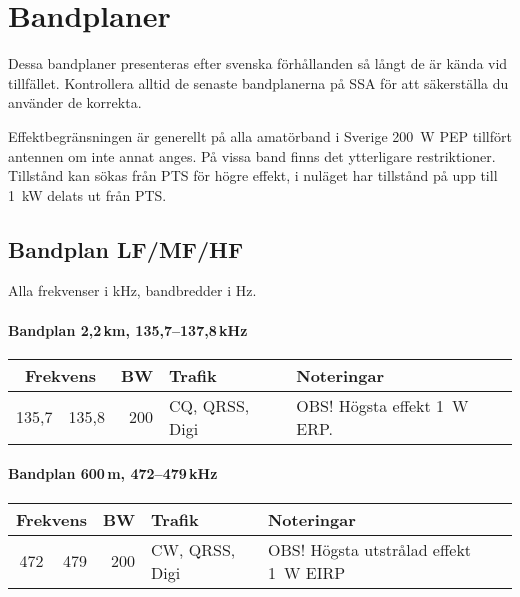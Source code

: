 \onecolumn

\chapter{Bandplaner}
\label{bandplaner2}

\noindent Dessa bandplaner presenteras efter svenska förhållanden så långt de
är kända vid tillfället. Kontrollera alltid de senaste bandplanerna på SSA för
att säkerställa du använder de korrekta.

Effektbegränsningen är generellt på alla amatörband i Sverige \SI{200}{W} PEP
tillfört antennen om inte annat anges. På vissa band finns det ytterligare
restriktioner. Tillstånd kan sökas från PTS för högre effekt, i nuläget har
tillstånd på upp till \SI{1}{kW} delats ut från PTS.

\section{Bandplan LF/MF/HF}

Alla frekvenser i \si{\kilo\hertz}, bandbredder i \si{\hertz}.

\subsubsection{Bandplan 2,2\,km, 135,7--137,8\,kHz}
\begin{tabular}{rrrll}
\multicolumn{2}{c}{\textbf{Frekvens}} & \textbf{BW} & \textbf{Trafik} & \textbf{Noteringar} \\ \hline
135,7 & 135,8 & 200 & CQ, QRSS, Digi & OBS! Högsta effekt \SI{1}{W} ERP. \\ \hline
\end{tabular}

\subsubsection{Bandplan 600\,m, 472--479\,kHz}
\begin{tabular}{rrrll}
\multicolumn{2}{c}{\textbf{Frekvens}} & \textbf{BW} & \textbf{Trafik} & \textbf{Noteringar} \\ \hline
472 & 479 & 200 & CW, QRSS, Digi & OBS! Högsta utstrålad effekt \SI{1}{W} EIRP \\ \hline
\end{tabular}

